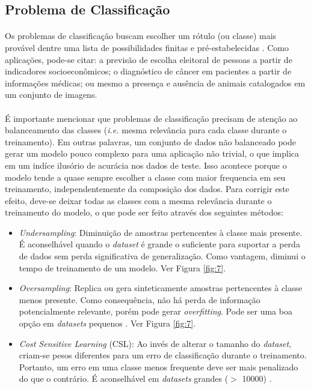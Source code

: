 \FloatBarrier
\subsection{Problema de Classificação}
\label{sub:class_prob}

\paragraph{} Os problemas de classificação buscam escolher um rótulo (ou classe) mais provável dentre uma lista de possibilidades finitas e pré-estabelecidas \cite{muller2016introduction}. Como aplicações, pode-se citar: a previsão de escolha eleitoral de pessoas a partir de indicadores socioeconômicos; o diagnóstico de câncer em pacientes a partir de informações médicas; ou mesmo a presença e ausência de animais catalogados em um conjunto de imagens.

\paragraph{} É importante mencionar que problemas de classificação precisam de atenção ao balanceamento das classes (\textit{i.e.} mesma relevância para cada classe durante o treinamento). Em outras palavras, um conjunto de dados não balanceado pode gerar um modelo pouco complexo para uma aplicação não trivial, o que implica em um indíce ilusório de acurácia nos dados de teste. Isso acontece porque o modelo tende a quase sempre escolher a classe com maior frequencia em seu treinamento, independentemente da composição dos dados. Para corrigir este efeito, deve-se deixar todas as classes com a mesma relevância durante o treinamento do modelo, o que pode ser feito através dos seguintes métodos:

\begin{itemize}
    \item \textit{Undersampling}: Diminuição de amostras pertencentes à classe mais presente. É aconselhável quando o \textit{dataset} é grande o suficiente para suportar a perda de dados sem perda significativa de generalização. Como vantagem, diminui o tempo de treinamento de um modelo. Ver Figura \ref{fig:7}.
    \item \textit{Oversampling}: Replica ou gera sinteticamente amostras pertencentes à classe menos presente. Como consequência, não há perda de informação potencialmente relevante, porém pode gerar \textit{overfitting}. Pode ser uma boa opção em \textit{datasets} pequenos \cite{weiss2007cost}. Ver Figura \ref{fig:7}.
    \item \textit{Cost Sensitive Learning} (CSL): Ao invés de alterar o tamanho do \textit{dataset}, criam-se pesos diferentes para um erro de classificação durante o treinamento. Portanto, um erro em uma classe menos frequente deve ser mais penalizado do que o contrário. É aconselhável em \textit{datasets} grandes ($>$ 10000) \cite{weiss2007cost}.
\end{itemize}

